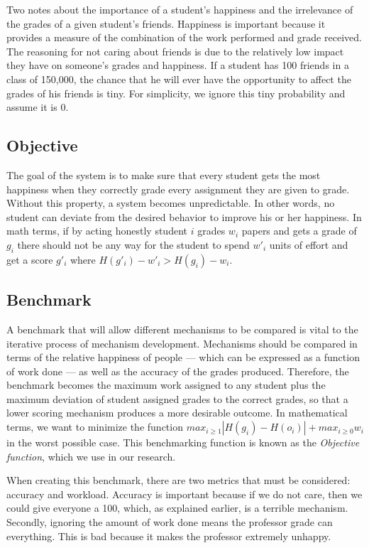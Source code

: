 \documentclass[12pt, Arial]{article}
\begin{document}
Two notes about the importance of a student's happiness and the irrelevance of the grades of a given student's friends. Happiness is important because it provides a measure of the combination of the work performed and grade received. The reasoning for not caring about friends is due to the relatively low impact they have on someone's grades and happiness. If a student has 100 friends in a class of 150,000, the chance that he will ever have the opportunity to affect the grades of his friends is tiny. For simplicity, we ignore this tiny probability and assume it is 0.

\subsection{Objective}
The goal of the system is to make sure that every student gets the most happiness when they correctly grade every assignment they are given to grade. Without this property, a system becomes unpredictable. In other words, no student can deviate from the desired behavior to improve his or her happiness. In math terms, if by acting honestly student $i$ grades $w_i$ papers and gets a grade of $g_i$ there should not be any way for the student to spend $w'_i$ units of effort and get a score $g'_i$ where $H(g'_i)-w'_i > H(g_i)-w_i$.

\subsection{Benchmark}
A benchmark that will allow different mechanisms to be compared is vital to the iterative process of mechanism development. Mechanisms should be compared in terms of the relative happiness of people --- which can be expressed as a function of work done --- as well as the accuracy of the grades produced. Therefore, the benchmark becomes the maximum work assigned to any student plus the maximum deviation of student assigned grades to the correct grades, so that a lower scoring mechanism produces a more desirable outcome. In mathematical terms, we want to minimize the function $max_{i \ge 1} |H(g_i)-H(o_i)| + max_{i \ge 0} w_i$ in the worst possible case. This benchmarking function is known as the \emph{Objective function}, which we use in our research.

When creating this benchmark, there are two metrics that must be considered: accuracy and workload. Accuracy is important because if we do not care, then we could give everyone a 100, which, as explained earlier, is a terrible mechanism. Secondly, ignoring the amount of work done means the professor grade can everything. This is bad because it makes the professor extremely unhappy.
\end{document}
